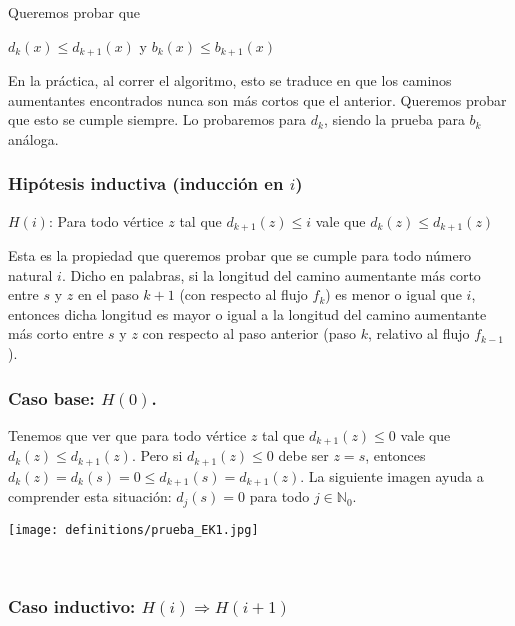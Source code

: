 \documentclass[10pt,a4paper]{article}
\begin{document}
Queremos probar que

\begin{center}
$d_k(x) \leq d_{k+1}(x)$ y $b_k(x) \leq b_{k+1}(x)$
\end{center}

En la práctica, al correr el algoritmo, esto se traduce en que los caminos aumentantes encontrados nunca son más cortos que el anterior. Queremos probar que esto se cumple siempre. Lo probaremos para $d_k$, siendo la prueba para $b_k$ análoga.

\subsubsection*{Hipótesis inductiva (inducción en $i$)}

$H(i)$: Para todo vértice $z$ tal que $d_{k+1}(z) \leq i$ vale que $d_k(z) \leq d_{k+1}(z)$

Esta es la propiedad que queremos probar que se cumple para todo número natural $i$. Dicho en palabras, si la longitud del camino aumentante más corto entre $s$ y $z$ en el paso $k+1$ (con respecto al flujo $f_k$) es menor o igual que $i$, entonces dicha longitud es mayor o igual a la longitud del camino aumentante más corto entre $s$ y $z$ con respecto al paso anterior (paso $k$, relativo al flujo $f_{k-1}$).

\subsubsection*{Caso base: $H(0)$.}

Tenemos que ver que para todo vértice $z$ tal que $d_{k+1}(z) \leq 0$ vale que $d_k(z) \leq d_{k+1}(z)$. Pero si $d_{k+1}(z) \leq 0$ debe ser $z=s$, entonces $d_k(z) = d_k(s) = 0 \leq d_{k+1}(s) = d_{k+1}(z)$. La siguiente imagen ayuda a comprender esta situación: $d_j(s) = 0 $ para todo $j \in \mathbb{N}_0$.

\begin{center}

    \begin{adjustbox}{max size={\textwidth}{\textheight}}
        \texttt{[image: definitions/prueba\_EK1.jpg]}
        \end{adjustbox}
    
\end{center}

 

\subsubsection*{Caso inductivo: $H(i) \Rightarrow H(i+1)$}
\end{document}
